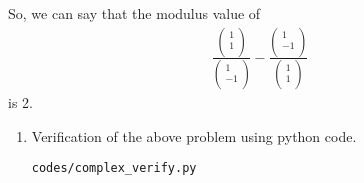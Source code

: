 \documentclass[journal,12pt,twocolumn]{IEEEtran}
\renewcommand\thesection{\arabic{section}}
\begin{document}
So, we can say that the modulus value of 
\begin{align}
\frac{\begin{pmatrix}
      1 \\ 
      1 \\
      \end{pmatrix}}{\begin{pmatrix}
      1 \\ 
      -1 \\
      \end{pmatrix}} - \frac{\begin{pmatrix}
      1 \\ 
      -1 \\
      \end{pmatrix}}{\begin{pmatrix}
      1 \\ 
      1 \\
      \end{pmatrix}}
\end{align} is 2.

\renewcommand{\theequation}{\theenumi}
\begin{enumerate}[label=\thesection.\arabic*.,ref=\thesection.\theenumi]
\item Verification of the above problem using python code.\\
\begin{lstlisting}
codes/complex_verify.py
\end{lstlisting}

\end{enumerate}
\end{document}
